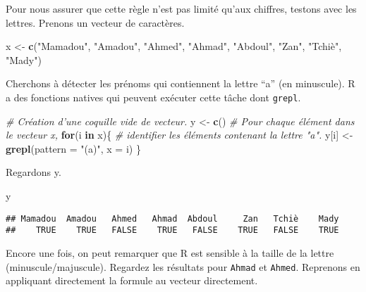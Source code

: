 \documentclass[]{book}
\newenvironment{Shaded}{\begin{snugshade}}{\end{snugshade}}
\newcommand{\KeywordTok}[1]{\textcolor[rgb]{0.13,0.29,0.53}{\textbf{#1}}}
\newcommand{\DataTypeTok}[1]{\textcolor[rgb]{0.13,0.29,0.53}{#1}}
\newcommand{\StringTok}[1]{\textcolor[rgb]{0.31,0.60,0.02}{#1}}
\newcommand{\CommentTok}[1]{\textcolor[rgb]{0.56,0.35,0.01}{\textit{#1}}}
\newcommand{\ControlFlowTok}[1]{\textcolor[rgb]{0.13,0.29,0.53}{\textbf{#1}}}
\newcommand{\NormalTok}[1]{#1}
\begin{document}
Pour nous assurer que cette règle n'est pas limité qu'aux chiffres,
testons avec les lettres. Prenons un vecteur de caractères.

\begin{Shaded}
\begin{Highlighting}[]
\NormalTok{x <-}\StringTok{ }\KeywordTok{c}\NormalTok{(}\StringTok{"Mamadou"}\NormalTok{, }\StringTok{"Amadou"}\NormalTok{, }\StringTok{"Ahmed"}\NormalTok{, }\StringTok{"Ahmad"}\NormalTok{, }\StringTok{"Abdoul"}\NormalTok{, }\StringTok{"Zan"}\NormalTok{, }\StringTok{"Tchiè"}\NormalTok{, }\StringTok{"Mady"}\NormalTok{)}
\end{Highlighting}
\end{Shaded}

Cherchons à détecter les prénoms qui contiennent la lettre ``a'' (en
minuscule). R a des fonctions natives qui peuvent exécuter cette tâche
dont \texttt{grepl}.

\begin{Shaded}
\begin{Highlighting}[]
\CommentTok{# Création d'une coquille vide de vecteur.}
\NormalTok{y <-}\StringTok{ }\KeywordTok{c}\NormalTok{() }
  \CommentTok{# Pour chaque élément dans le vecteur x,}
\ControlFlowTok{for}\NormalTok{(i }\ControlFlowTok{in}\NormalTok{ x)\{ }
  \CommentTok{# identifier les éléments contenant la lettre "a".}
\NormalTok{  y[i] <-}\StringTok{ }\KeywordTok{grepl}\NormalTok{(}\DataTypeTok{pattern =} \StringTok{"(a)"}\NormalTok{, }\DataTypeTok{x =}\NormalTok{ i) }
\NormalTok{\}}
\end{Highlighting}
\end{Shaded}

Regardons y.

\begin{Shaded}
\begin{Highlighting}[]
\NormalTok{y}
\end{Highlighting}
\end{Shaded}

\begin{verbatim}
## Mamadou  Amadou   Ahmed   Ahmad  Abdoul     Zan   Tchiè    Mady 
##    TRUE    TRUE   FALSE    TRUE   FALSE    TRUE   FALSE    TRUE
\end{verbatim}

Encore une fois, on peut remarquer que R est sensible à la taille de la
lettre (minuscule/majuscule). Regardez les résultats pour \texttt{Ahmad}
et \texttt{Ahmed}. Reprenons en appliquant directement la formule au
vecteur directement.
\end{document}
